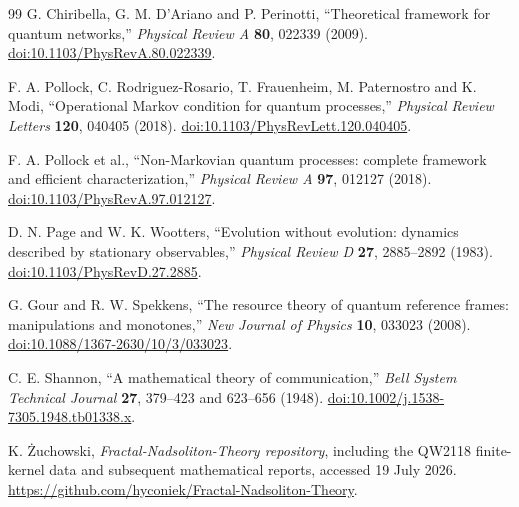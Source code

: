 \documentclass[11pt,a4paper]{article}
\theoremstyle{definition}
\theoremstyle{remark}
\begin{document}
\begin{thebibliography}{99}
G. Chiribella, G. M. D'Ariano and P. Perinotti, ``Theoretical framework for quantum networks,'' \emph{Physical Review A} \textbf{80}, 022339 (2009). \href{https://doi.org/10.1103/PhysRevA.80.022339}{doi:10.1103/PhysRevA.80.022339}.

F. A. Pollock, C. Rodriguez-Rosario, T. Frauenheim, M. Paternostro and K. Modi, ``Operational Markov condition for quantum processes,'' \emph{Physical Review Letters} \textbf{120}, 040405 (2018). \href{https://doi.org/10.1103/PhysRevLett.120.040405}{doi:10.1103/PhysRevLett.120.040405}.

F. A. Pollock et al., ``Non-Markovian quantum processes: complete framework and efficient characterization,'' \emph{Physical Review A} \textbf{97}, 012127 (2018). \href{https://doi.org/10.1103/PhysRevA.97.012127}{doi:10.1103/PhysRevA.97.012127}.

D. N. Page and W. K. Wootters, ``Evolution without evolution: dynamics described by stationary observables,'' \emph{Physical Review D} \textbf{27}, 2885--2892 (1983). \href{https://doi.org/10.1103/PhysRevD.27.2885}{doi:10.1103/PhysRevD.27.2885}.

G. Gour and R. W. Spekkens, ``The resource theory of quantum reference frames: manipulations and monotones,'' \emph{New Journal of Physics} \textbf{10}, 033023 (2008). \href{https://doi.org/10.1088/1367-2630/10/3/033023}{doi:10.1088/1367-2630/10/3/033023}.

C. E. Shannon, ``A mathematical theory of communication,'' \emph{Bell System Technical Journal} \textbf{27}, 379--423 and 623--656 (1948). \href{https://doi.org/10.1002/j.1538-7305.1948.tb01338.x}{doi:10.1002/j.1538-7305.1948.tb01338.x}.

K. Żuchowski, \emph{Fractal-Nadsoliton-Theory repository}, including the QW2118 finite-kernel data and subsequent mathematical reports, accessed 19 July 2026. \url{https://github.com/hyconiek/Fractal-Nadsoliton-Theory}.

\end{thebibliography}
\end{document}
